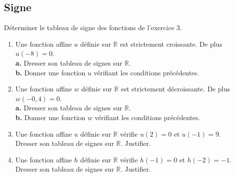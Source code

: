 {\newpage

\subsection*{Signe}


\begin{Exercice} %
Déterminer le tableau de signe des fonctions de l'exercice 3.
\end{Exercice}



\begin{Exercice} %
\leavevmode\vspace{-\baselineskip}
\begin{enumerate}[itemsep=1.75em]
	\item \begin{minipage}[t]{\linewidth}Une fonction affine $u$  définie sur $\mathbb R$ est strictement croissante. De plus $u(-8)=0$.\\
        \textbf {a.}  Dresser son tableau de signes sur $\mathbb R$.\\
        \textbf {b.}  Donner une fonction $u$ vérifiant les conditions précédentes.\end{minipage}
	\item \begin{minipage}[t]{\linewidth}Une fonction affine $w$  définie sur $\mathbb R$ est strictement décroissante. De plus $w(-0{,}4)=0$.\\
        \textbf {a.}  Dresser son tableau de signes sur $\mathbb R$.\\
        \textbf {b.}  Donner une fonction $w$ vérifiant les conditions précédentes.\end{minipage}
	\item \begin{minipage}[t]{\linewidth}Une fonction affine $u$  définie sur $\mathbb R$ vérifie $u(2)=0$ et $u(-1)=9$.\\
           Dresser son tableau de signes sur $\mathbb R$. Justifier.
         \end{minipage}
	\item \begin{minipage}[t]{\linewidth}Une fonction affine $h$  définie sur $\mathbb R$ vérifie $h(-1)=0$ et $h(-2)=-1$.\\
           Dresser son tableau de signes sur $\mathbb R$. Justifier.
         \end{minipage}
\end{enumerate}
\end{Exercice}

}
